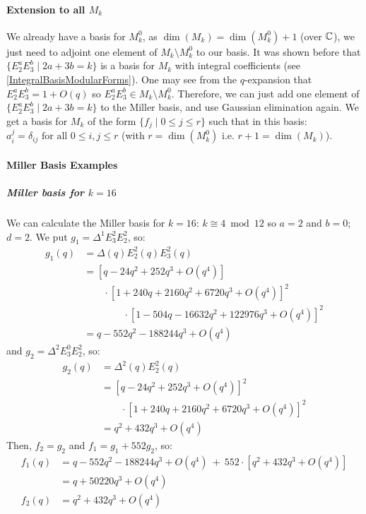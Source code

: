 \paragraph{Extension to all $M_k$}
We already have a basis for $M_k^0$, as $\dim(M_k) = \dim(M_k^0) + 1$ (over $\mathbb{C}$), we just need to adjoint one element of $M_k \setminus M_k^0$ to our basis.
It was shown before that $\{E_2^aE_3^b \mid 2a+3b=k\}$ is a basis for $M_k$ with integral coefficients (see \ref{IntegralBasisModularForms}).
One may see from the $q$-expansion that $E_2^aE_3^b = 1 + O(q)$ so $E_2^aE_3^b \in M_k \setminus M_k^0$.
Therefore, we can just add one element of $\{E_2^aE_3^b \mid 2a+3b = k\}$ to the Miller basis, and use Gaussian elimination again.
We get a basis for $M_k$ of the form $\{f_j \mid 0 \leq j \leq r \}$ such that in this basis: $a_i^j = \delta_{ij} \text{ for all } 0 \leq i,j \leq r$ (with $r=\dim(M_k^0)$ i.e. $r+1=\dim(M_k)$).

\paragraph{Miller Basis Examples}
\subparagraph{Miller basis for $k=16$}
We can calculate the Miller basis for $k=16$:
$k \cong 4 \bmod 12$ so $a=2$ and $b=0$; $d=2$.
We put $g_1 = \Delta^1E_3^2E_2^2$, so:
\begin{align*}
    g_1(q) &= \Delta(q)E_2^2(q)E_3^2(q)\\
           &= \left[ q - 24q^2 + 252q^3 + O(q^4) \right]\\
           & \qquad \cdot \left[ 1 + 240q + 2160q^2 + 6720q^3 + O(q^4) \right]^2\\
           & \qquad \qquad \cdot \left[ 1 - 504q - 16632q^2 + 122976q^3 + O(q^4) \right]^2\\
           &= q - 552q^2 - 188244q^3 + O(q^4)
\end{align*}
and $g_2 = \Delta^2E_3^0E_2^2$, so:
\begin{align*}
    g_2(q) &= \Delta^2(q)E_2^2(q)\\
           &= \left[ q - 24q^2 + 252q^3 + O(q^4) \right]^2\\
           & \qquad \cdot \left[ 1 + 240q + 2160q^2 + 6720q^3 + O(q^4) \right]^2\\
           &= q^2 + 432q^3 + O(q^4)
\end{align*}
Then, $f_2=g_2$ and $f_1=g_1+552g_2$, so:
\begin{align*}
    f_1(q) &= q - 552q^2 - 188244q^3 + O(q^4) \ + \ 552 \cdot \left[q^2 + 432q^3 + O(q^4)\right] \\
           &= q + 50220q^3 + O(q^4)\\
    f_2(q) &= q^2 + 432q^3 + O(q^4)\\
\end{align*}

